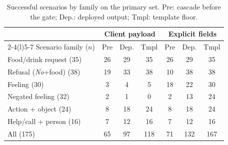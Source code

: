 \begin{table}[t]
\centering\footnotesize
\setlength{\tabcolsep}{2.6pt}
\begin{tabular}{@{}lcccccc@{}}
\toprule
 & \multicolumn{3}{c}{Client payload} & \multicolumn{3}{c}{Explicit fields} \\
\cmidrule(lr){2-4}\cmidrule(l){5-7}
Scenario family ($n$) & Pre & Dep. & Tmpl & Pre & Dep. & Tmpl \\
\midrule
Food/drink request (35) & 26 & 29 & 35 & 26 & 29 & 35 \\
Refusal (\emph{No}+food) (38) & 19 & 33 & 38 & 10 & 38 & 38 \\
Feeling (30) & 3 & 4 & 5 & 18 & 22 & 30 \\
Negated feeling (32) & 2 & 1 & 0 & 2 & 13 & 24 \\
Action + object (24) & 8 & 18 & 24 & 8 & 18 & 24 \\
Help/call + person (16) & 7 & 12 & 16 & 7 & 12 & 16 \\
\midrule
All (175) & 65 & 97 & 118 & 71 & 132 & 167 \\
\bottomrule
\end{tabular}
\caption{Successful scenarios by family on the primary set. Pre: cascade before the gate; Dep.: deployed output; Tmpl: template floor.}
\label{tab:type}
\end{table}
